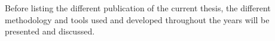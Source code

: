 
Before listing the different publication of the current thesis, the different
methodology and tools used and developed throughout the years will be presented
and discussed.




